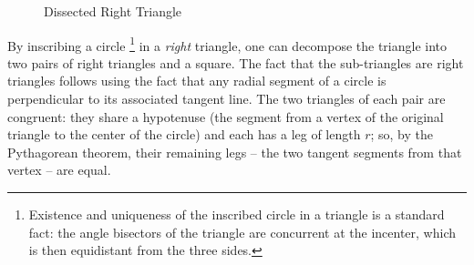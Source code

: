 \documentclass[12pt]{article}
\theoremstyle{plain}
\begin{document}
\begin{figure}[!ht]
\begin{center}
\end{center}
\caption{Dissected Right Triangle}
\label{fig:geo}
\end{figure}

By inscribing a circle%
\footnote{Existence and uniqueness of the inscribed circle in a triangle is
a standard fact: the angle bisectors of the triangle are concurrent at the
incenter, which is then equidistant from the three sides.}
in a {\em right\/} triangle, one can decompose the triangle 
into two pairs of right triangles and a square. The fact that the sub-triangles
are right triangles follows using the fact that 
any radial segment of a circle is perpendicular to its
associated tangent line. 
The two triangles of each pair are congruent: they share a hypotenuse
(the segment from a vertex of the original triangle to the center of the
circle) and each has a leg of length $r$; so, by the Pythagorean theorem,
their remaining legs -- the two tangent segments from that vertex -- are equal.
\end{document}
